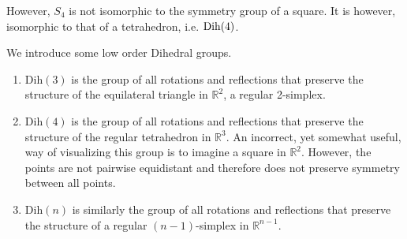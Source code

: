  However, $S_4$ is not isomorphic to the symmetry group of a square. It is however, isomorphic to that of a tetrahedron, i.e. $\operatorname{Dih}(4)$. 

  \begin{example}
    We introduce some low order Dihedral groups. 
    \begin{enumerate}
      \item Dih$(3)$ is the group of all rotations and reflections that preserve the structure of the equilateral triangle in $\mathbb{R}^2$, a regular 2-simplex. 
      \begin{center}
      \end{center}
      \item Dih$(4)$ is the group of all rotations and reflections that preserve the structure of the regular tetrahedron in $\mathbb{R}^{3}$. An incorrect, yet somewhat useful, way of visualizing this group is to imagine a square in $\mathbb{R}^{2}$. However, the points are not pairwise equidistant and therefore does not preserve symmetry between all points.
      \item Dih$(n)$ is similarly the group of all rotations and reflections that preserve the structure of a regular $(n-1)$-simplex in $\mathbb{R}^{n-1}$. 
    \end{enumerate}
  \end{example} 

